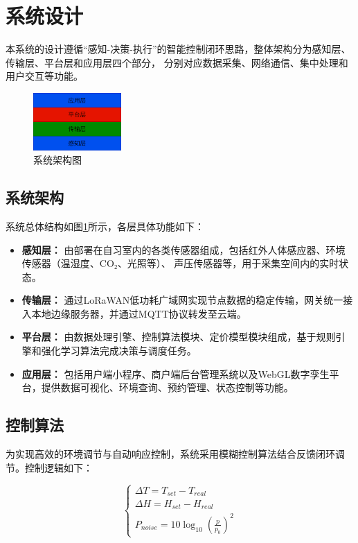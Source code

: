 \documentclass[12pt,a4paper]{IEEEtran} %
\begin{document}
\section{系统设计}
本系统的设计遵循“感知-决策-执行”的智能控制闭环思路，整体架构分为感知层、传输层、平台层和应用层四个部分，
分别对应数据采集、网络通信、集中处理和用户交互等功能。
\begin{figure}[htbp]
  \centering
  \includegraphics[width=0.3\textwidth]{framework.png}
  \caption{系统架构图}
  \label{fig}
\end{figure}

\subsection{系统架构}
系统总体结构如图\ref{fig}所示，各层具体功能如下：

\begin{itemize}
  \item \textbf{感知层：} 由部署在自习室内的各类传感器组成，包括红外人体感应器、环境传感器（温湿度、CO₂、光照等）、
        声压传感器等，用于采集空间内的实时状态。
  \item \textbf{传输层：} 通过LoRaWAN低功耗广域网实现节点数据的稳定传输，网关统一接入本地边缘服务器，并通过MQTT协议转发至云端。
  \item \textbf{平台层：} 由数据处理引擎、控制算法模块、定价模型模块组成，基于规则引擎和强化学习算法完成决策与调度任务。
  \item \textbf{应用层：} 包括用户端小程序、商户端后台管理系统以及WebGL数字孪生平台，提供数据可视化、环境查询、预约管理、状态控制等功能。
\end{itemize}

\subsection{控制算法}
为实现高效的环境调节与自动响应控制，系统采用模糊控制算法结合反馈闭环调节。控制逻辑如下：

\begin{equation}
  \begin{cases}
    \Delta T = T_{set} - T_{real} \\[3pt]
    \Delta H = H_{set} - H_{real} \\[3pt]
    P_{noise} = 10\log_{10}\left(\frac{p}{p_0}\right)^2
  \end{cases}
\end{equation}
\end{document}
